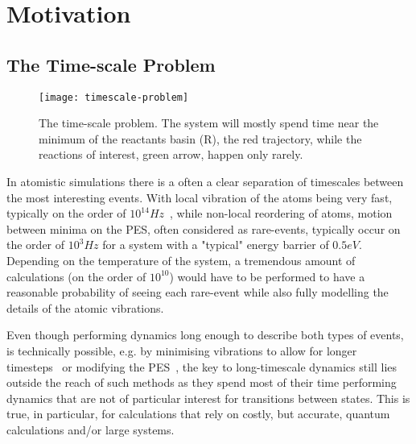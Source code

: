 
\section{Motivation}
\subsection{The Time-scale Problem}
\label{sec:tst-timescale-problem}

\begin{figure}[h]
\begin{center}
\texttt{[image: timescale-problem]}
    \parbox{0.85\linewidth}{
\caption{The time-scale problem.
The system will mostly spend time near the minimum of the reactants basin (R), the red trajectory, while the reactions of interest, green arrow, happen only rarely.}
\label{fig:timescale-problem}
    }
\end{center}
\end{figure}

In atomistic simulations there is a often a clear separation of timescales between the most interesting events.
With local vibration of the atoms being very fast, typically on the order of $10^{14} \unit{Hz}$~\cite{mcquarrie-1983},
while non-local reordering of atoms, motion between minima on the PES, often considered as rare-events, typically occur on the order of $10^3 \unit{Hz}$ for a system with a "typical" energy barrier of $0.5 \unit{eV}$.
Depending on the temperature of the system, a tremendous amount of calculations (on the order of $10^{10}$) would have to be performed to have a reasonable probability of seeing each rare-event while also fully modelling the details of the atomic vibrations.

Even though performing dynamics long enough to describe both types of events, is technically possible, e.g. by minimising vibrations to allow for longer timesteps~\cite{shake-1977, rattle-1983} or modifying the PES~\cite{hyperdynamics-voter-1997}, the key to long-timescale dynamics still lies outside the reach of such methods as they spend most of their time performing dynamics that are not of particular interest for transitions between states.
This is true, in particular, for calculations that rely on costly, but accurate, quantum calculations and/or large systems.

